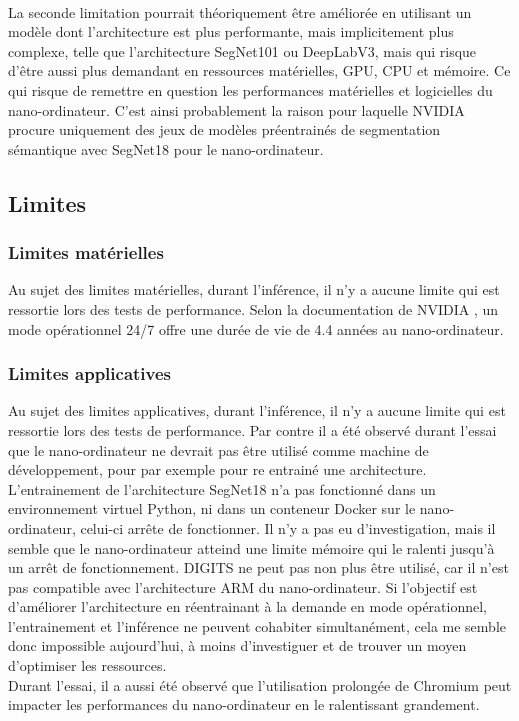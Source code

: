 \vspace{0.5\baselineskip}
\\
\noindent La seconde limitation pourrait théoriquement être améliorée en utilisant un modèle dont l'architecture est plus performante, mais implicitement plus complexe, telle que l'architecture SegNet101 ou DeepLabV3, mais qui risque d'être aussi plus demandant en ressources matérielles, GPU, CPU et mémoire. Ce qui risque de remettre en question les performances matérielles et logicielles du nano-ordinateur. C'est ainsi probablement la raison pour laquelle NVIDIA procure uniquement des jeux de modèles préentrainés de segmentation sémantique avec SegNet18 pour le nano-ordinateur. 
\subsection{Limites}
\subsubsection{Limites matérielles}
\noindent Au sujet des limites matérielles, durant l'inférence, il n'y a aucune limite qui est ressortie lors des tests de performance. Selon la documentation de NVIDIA \parencite{nvidia_nvidia_2020}, un mode opérationnel 24/7 offre une durée de vie de 4.4 années au nano-ordinateur.
\subsubsection{Limites applicatives}
\noindent Au sujet des limites applicatives, durant l'inférence, il n'y a aucune limite qui est ressortie lors des tests de performance. Par contre il a été observé durant l'essai que le nano-ordinateur ne devrait pas être utilisé comme machine de développement, pour par exemple pour re entrainé une architecture. L'entrainement de l'architecture SegNet18 n'a pas fonctionné dans un environnement virtuel Python, ni dans un conteneur Docker sur le nano-ordinateur, celui-ci arrête de fonctionner. Il n'y a pas eu d'investigation, mais il semble que le nano-ordinateur atteind une limite mémoire qui le ralenti jusqu'à un arrêt de fonctionnement. DIGITS ne peut pas non plus être utilisé, car il n'est pas compatible avec l'architecture ARM du nano-ordinateur. Si l'objectif est d'améliorer l'architecture en réentrainant à la demande en mode opérationnel, l'entrainement et l'inférence ne peuvent cohabiter simultanément, cela me semble donc impossible aujourd'hui, à moins d'investiguer et de trouver un moyen d'optimiser les ressources.
\vspace{0.5\baselineskip}
\\
\noindent Durant l'essai, il a aussi été observé que l'utilisation prolongée de Chromium peut impacter les performances du nano-ordinateur en le ralentissant grandement. 
